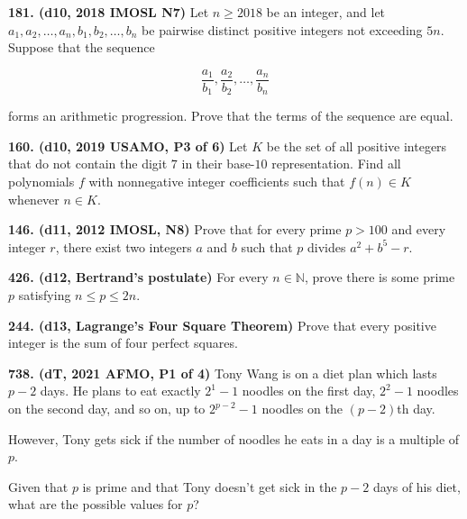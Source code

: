 \documentclass{article}
\begin{document}
\textbf{181. (\color{red}d10\color{black}, 2018 IMOSL N7)} Let $n \ge 2018$ be an integer, and let $a_1, a_2, \dots, a_n, b_1, b_2, \dots, b_n$ be pairwise distinct positive integers not exceeding $5n$. Suppose that the sequence

$$\frac{a_1}{b_1}, \frac{a_2}{b_2}, \dots, \frac{a_n}{b_n}$$

forms an arithmetic progression. Prove that the terms of the sequence are equal.

\textbf{160. (\color{red}d10\color{black}, 2019 USAMO, P3 of 6)} Let $K$ be the set of all positive integers that do not contain the digit $7$ in their base-$10$ representation. Find all polynomials $f$ with nonnegative integer coefficients such that $f(n)\in K$ whenever $n\in K$.

\textbf{146. (\color{red}d11\color{black}, 2012 IMOSL, N8)} Prove that for every prime $p>100$ and every integer $r$, there exist two integers $a$ and $b$ such that $p$ divides $a^2+b^5-r$.

\textbf{426. (\color{red}d12\color{black}, Bertrand's postulate)} For every $n \in \mathbb N$, prove there is some prime $p$ satisfying $n \leq p \leq 2n$.

\textbf{244. (\color{red}d13\color{black}, Lagrange's Four Square Theorem)} Prove that every positive integer is the sum of four perfect squares.

\textbf{738. (\color{red}dT\color{black}, 2021 AFMO, P1 of 4)} Tony Wang is on a diet plan which lasts $p-2$ days. He plans to eat exactly $2^1 - 1$ noodles on the first day, $2^2 - 1$ noodles on the second day, and so on, up to $2^{p-2} - 1$ noodles on the $(p-2)$th day.

However, Tony gets sick if the number of noodles he eats in a day is a multiple of $p$.

Given that $p$ is prime and that Tony doesn't get sick in the $p-2$ days of his diet, what are the possible values for $p$?
\end{document}

